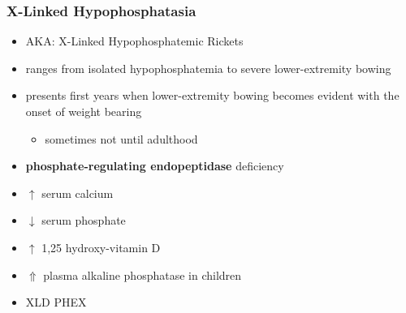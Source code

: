 \documentclass[12pt]{scrartcl}
\begin{document}
\subsubsection{X-Linked Hypophosphatasia}
\label{sec:org9c5b976}
\begin{itemize}
\item AKA: X-Linked Hypophosphatemic Rickets
\item ranges from isolated hypophosphatemia to severe lower-extremity bowing
\item presents first  years when lower-extremity bowing becomes
evident with the onset of weight bearing
\begin{itemize}
\item sometimes not until adulthood
\end{itemize}
\item \textbf{phosphate-regulating endopeptidase} deficiency
\item \(\uparrow\) serum calcium
\item \(\downarrow\) serum phosphate
\item \(\uparrow\) 1,25 hydroxy-vitamin D
\item \(\Uparrow\) plasma alkaline phosphatase in children
\item XLD PHEX
\end{itemize}
\end{document}

